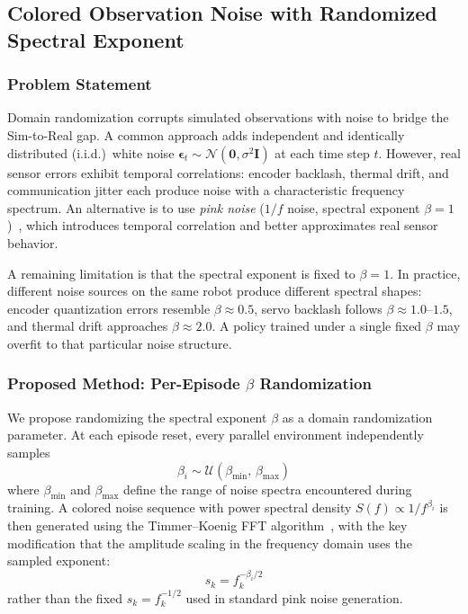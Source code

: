 %

\subsection{Colored Observation Noise with Randomized Spectral Exponent}
\label{sec:colored_obs_noise}

\subsubsection{Problem Statement}

Domain randomization corrupts simulated observations with noise to bridge the Sim-to-Real gap.
A common approach adds independent and identically distributed (i.i.d.)\ white noise
$\boldsymbol{\epsilon}_t \sim \mathcal{N}(\boldsymbol{0}, \sigma^2 \boldsymbol{I})$
at each time step $t$.
However, real sensor errors exhibit temporal correlations:
encoder backlash, thermal drift, and communication jitter each produce noise
with a characteristic frequency spectrum.
An alternative is to use \emph{pink noise} ($1/f$ noise, spectral exponent $\beta=1$)~\cite{eberhard2023pink},
which introduces temporal correlation and better approximates real sensor behavior.

A remaining limitation is that the spectral exponent is fixed to $\beta = 1$.
In practice, different noise sources on the same robot produce different spectral shapes:
encoder quantization errors resemble $\beta \approx 0.5$,
servo backlash follows $\beta \approx 1.0$--$1.5$,
and thermal drift approaches $\beta \approx 2.0$.
A policy trained under a single fixed $\beta$ may overfit to that particular noise structure.

\subsubsection{Proposed Method: Per-Episode $\beta$ Randomization}

We propose randomizing the spectral exponent $\beta$ as a domain randomization parameter.
At each episode reset, every parallel environment independently samples
\begin{equation}
  \beta_i \sim \mathcal{U}(\beta_{\min},\, \beta_{\max})
  \label{eq:beta_sample}
\end{equation}
where $\beta_{\min}$ and $\beta_{\max}$ define the range of noise spectra encountered during training.
A colored noise sequence with power spectral density $S(f) \propto 1/f^{\beta_i}$ is then generated
using the Timmer--Koenig FFT algorithm~\cite{timmer1995}, with the key modification that the
amplitude scaling in the frequency domain uses the sampled exponent:
\begin{equation}
  s_k = f_k^{-\beta_i / 2}
  \label{eq:scaling}
\end{equation}
rather than the fixed $s_k = f_k^{-1/2}$ used in standard pink noise generation.

